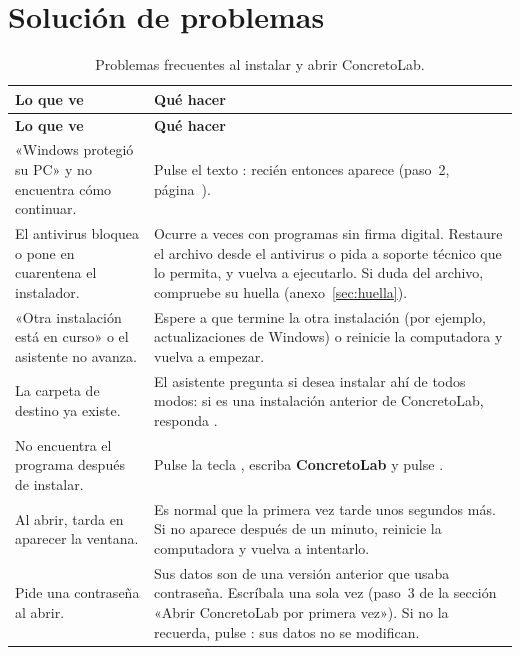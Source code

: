 \section{Solución de problemas}

\begin{longtable}{L{5.2cm}L{8.6cm}}
	\caption{Problemas frecuentes al instalar y abrir ConcretoLab.} \label{tab:problemas} \\
	\hline
	\textbf{Lo que ve} & \textbf{Qué hacer} \\ \hline
	\endfirsthead
	\hline
	\textbf{Lo que ve} & \textbf{Qué hacer} \\ \hline
	\endhead
	\hline
	\endfoot

	«Windows protegió su PC» y no encuentra cómo continuar. &
	Pulse el texto : recién entonces aparece 
	(paso~2, página~\pageref{sec:smartscreen}). \\ \hline

	El antivirus bloquea o pone en cuarentena el instalador. &
	Ocurre a veces con programas sin firma digital. Restaure el archivo desde el antivirus o pida a soporte técnico que
	lo permita, y vuelva a ejecutarlo. Si duda del archivo, compruebe su huella (anexo~\ref{sec:huella}). \\ \hline

	«Otra instalación está en curso» o el asistente no avanza. &
	Espere a que termine la otra instalación (por ejemplo, actualizaciones de Windows) o reinicie la computadora y vuelva a
	empezar. \\ \hline

	La carpeta de destino ya existe. &
	El asistente pregunta si desea instalar ahí de todos modos: si es una instalación anterior de ConcretoLab, responda
	. \\ \hline

	No encuentra el programa después de instalar. &
	Pulse la tecla , escriba \textbf{ConcretoLab} y pulse . \\ \hline

	Al abrir, tarda en aparecer la ventana. &
	Es normal que la primera vez tarde unos segundos más. Si no aparece después de un minuto, reinicie la computadora y
	vuelva a intentarlo. \\ \hline

	Pide una contraseña al abrir. &
	Sus datos son de una versión anterior que usaba contraseña. Escríbala una sola vez (paso~3 de la sección «Abrir
	ConcretoLab por primera vez»). Si no la recuerda, pulse : sus datos no se modifican. \\ \hline


\end{longtable}
